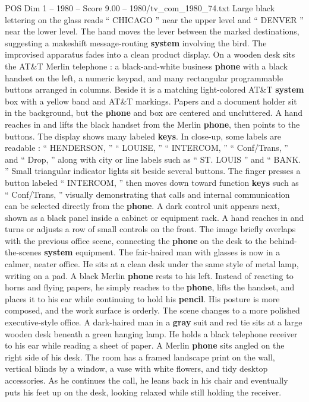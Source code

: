 \begin{textsample}{POS Dim 1 – 1980 – Score 9.00 – 1980/tv\_com\_1980\_74.txt}
Large black lettering on the glass reads “ CHICAGO ” near the upper level and “ DENVER ” near the lower level.
The hand moves the lever between the marked destinations, suggesting a makeshift message-routing \textbf{system} involving the bird.
The improvised apparatus fades into a clean product display.
On a wooden desk sits the AT\&T Merlin telephone : a black-and-white business \textbf{phone} with a black handset on the left, a numeric keypad, and many rectangular programmable buttons arranged in columns.
Beside it is a matching light-colored AT\&T \textbf{system} box with a yellow band and AT\&T markings.
Papers and a document holder sit in the background, but the \textbf{phone} and box are centered and uncluttered.
A hand reaches in and lifts the black handset from the Merlin \textbf{phone}, then points to the buttons.
The display shows many labeled \textbf{keys}.
In close-up, some labels are readable : “ HENDERSON, ” “ LOUISE, ” “ INTERCOM, ” “ Conf/Trans, ” and “ Drop, ” along with city or line labels such as “ ST.
LOUIS ” and “ BANK. ” Small triangular indicator lights sit beside several buttons.
The finger presses a button labeled “ INTERCOM, ” then moves down toward function \textbf{keys} such as “ Conf/Trans, ” visually demonstrating that calls and internal communication can be selected directly from the \textbf{phone}.
A dark control unit appears next, shown as a black panel inside a cabinet or equipment rack.
A hand reaches in and turns or adjusts a row of small controls on the front.
The image briefly overlaps with the previous office scene, connecting the \textbf{phone} on the desk to the behind-the-scenes \textbf{system} equipment.
The fair-haired man with glasses is now in a calmer, neater office.
He sits at a clean desk under the same style of metal lamp, writing on a pad.
A black Merlin \textbf{phone} rests to his left.
Instead of reacting to horns and flying papers, he simply reaches to the \textbf{phone}, lifts the handset, and places it to his ear while continuing to hold his \textbf{pencil}.
His posture is more composed, and the work surface is orderly.
The scene changes to a more polished executive-style office.
A dark-haired man in a \textbf{gray} suit and red tie sits at a large wooden desk beneath a green hanging lamp.
He holds a black telephone receiver to his ear while reading a sheet of paper.
A Merlin \textbf{phone} sits angled on the right side of his desk.
The room has a framed landscape print on the wall, vertical blinds by a window, a vase with white flowers, and tidy desktop accessories.
As he continues the call, he leans back in his chair and eventually puts his feet up on the desk, looking relaxed while still holding the receiver.

\end{textsample}
